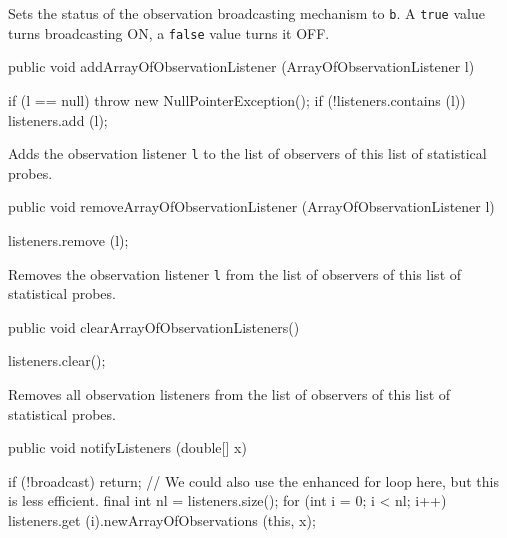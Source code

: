 \begin{tabb}   Sets the status of the observation broadcasting
 mechanism to \texttt{b}.  A \texttt{true} value
 turns broadcasting ON, a \texttt{false}
 value turns it OFF.
\end{tabb}
\begin{htmlonly}
\end{htmlonly}
\begin{code}

   public void addArrayOfObservationListener (ArrayOfObservationListener l)\begin{hide} {
      if (l == null)
         throw new NullPointerException();
      if (!listeners.contains (l))
         listeners.add (l);
   }\end{hide}
\end{code}
\begin{tabb}   Adds the observation listener \texttt{l} to the list of observers of
    this list of statistical probes.
\end{tabb}
\begin{htmlonly}
\end{htmlonly}
\begin{code}

   public void removeArrayOfObservationListener (ArrayOfObservationListener l)\begin{hide} {
      listeners.remove (l);
   }\end{hide}
\end{code}
\begin{tabb}   Removes the observation listener \texttt{l} from the list of observers of
    this list of statistical probes.
\end{tabb}
\begin{htmlonly}
\end{htmlonly}
\begin{code}

   public void clearArrayOfObservationListeners()\begin{hide} {
      listeners.clear();
   }\end{hide}
\end{code}
\begin{tabb}   Removes all observation listeners from the list of observers of
    this list of statistical probes.
\end{tabb}
\begin{code}

   public void notifyListeners (double[] x)\begin{hide} {
      if (!broadcast)
         return;
      // We could also use the enhanced for loop here, but this is less efficient.
      final int nl = listeners.size();
      for (int i = 0; i < nl; i++)
         listeners.get (i).newArrayOfObservations (this, x);
   }\end{hide}
\end{code}
